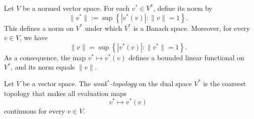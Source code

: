 

\begin{theorem} \cite[Theorem 4.3]{rudin91functional} %
Let \( V \) be a normed vector space. For each \( v^* \in V^* \), define its norm by
\[
\|v^*\| := \sup \left\{ | v^*(v) | : \|v\| = 1 \right\}.
\]
This defines a norm on \( V^* \) under which \( V^* \) is a Banach space. Moreover, for every \( v \in V \), we have
\[
\|v\| = \sup \left\{ | v^*(v) | : \|v^*\| = 1 \right\}.
\]
As a consequence, the map \( v^* \mapsto v^*(v)  \) defines a bounded linear functional on \( V^* \), and its norm equals \( \|v\| \).
\end{theorem}

\begin{definition} \label{def:weak*_top}
Let \( V \) be a vector space. The \emph{weak\(^*\)-topology} on the dual space \( V^* \) is the coarsest topology that makes all evaluation maps
\[
v^* \mapsto v^*(v) 
\]
continuous for every \( v \in V \).
\end{definition}



